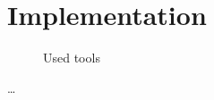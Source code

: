 \chapter{Implementation}
\label{ch:implementation}

\begin{figure}
    \centering
    
    \caption{Used tools}
    \label{fig:tools}
\end{figure}

\dots
